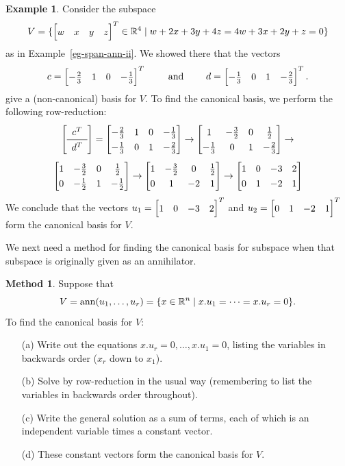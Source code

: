 \documentclass[reqno]{amsart}
\theoremstyle{definition}
\newtheorem{example}[theorem]{Example}
\newtheorem{method}[theorem]{Method}
\begin{document}
\begin{example}\label{eg-span-ann-ii-canonical}
 Consider the subspace
 \[ V = \{\bbm w&x&y&z\ebm^T\in\R^4\st w+2x+3y+4z=4w+3x+2y+z=0\}  \]
 as in Example~\ref{eg-span-ann-ii}.  We showed there that the vectors
 \[ c = \bbm -\tfrac{2}{3} & 1 & 0 & -\tfrac{1}{3} \ebm^T
    \hspace{2em} \text{ and } \hspace{2em}
    d = \bbm -\tfrac{1}{3} & 0 & 1 & -\tfrac{2}{3} \ebm^T.
 \]
 give a (non-canonical) basis for $V$.  To find the canonical basis,
 we perform the following row-reduction:
 \[ {\renewcommand{\arraystretch}{1.3}
     \left[\begin{array}{c} c^T \\ \hline d^T \end{array}\right]}
    =
    \bbm -\tfrac{2}{3} & 1 & 0 & -\tfrac{1}{3} \\
         -\tfrac{1}{3} & 0 & 1 & -\tfrac{2}{3} \ebm
    \to
    \bbm 1 & -\tfrac{3}{2} & 0 & \tfrac{1}{2} \\
         -\tfrac{1}{3} & 0 & 1 & -\tfrac{2}{3} \ebm
    \to
 \] \[
    \bbm 1 & -\tfrac{3}{2} & 0 & \tfrac{1}{2} \\
         0 & -\tfrac{1}{2} & 1 & -\tfrac{1}{2} \ebm
    \to
    \bbm 1 & -\tfrac{3}{2} & 0  & \tfrac{1}{2} \\
         0 & 1             & -2 & 1 \ebm
    \to
    \bbm 1 & 0 & -3 & 2 \\
         0 & 1 & -2 & 1 \ebm
 \]
 We conclude that the vectors $u_1=\bbm 1 & 0 & -3 & 2\ebm^T$ and
 $u_2=\bbm 0&1&-2&1\ebm^T$ form the canonical basis for $V$.
\end{example}

We next need a method for finding the canonical basis for subspace
when that subspace is originally given as an annihilator.

\begin{method}\label{meth-ann-basis}
 Suppose that
 \[ V=\operatorname{ann}(u_1,\dotsc,u_r)=\{x\in{\mathbb{R}}^n\;|\; x.u_1=\dotsb=x.u_r=0\}. \]
 To find the canonical basis for $V$:
 \begin{itemize}
  \item[(a)] Write out the equations $x.u_r=0,\dotsc,x.u_1=0$, listing
   the variables in backwards order ($x_r$ down to $x_1$).
  \item[(b)] Solve by row-reduction in the usual way (remembering to
   list the variables in backwards order throughout).
  \item[(c)] Write the general solution as a sum of terms, each of
   which is an independent variable times a constant vector.
  \item[(d)] These constant vectors form the canonical basis for $V$.
 \end{itemize}
\end{method}
\end{document}
